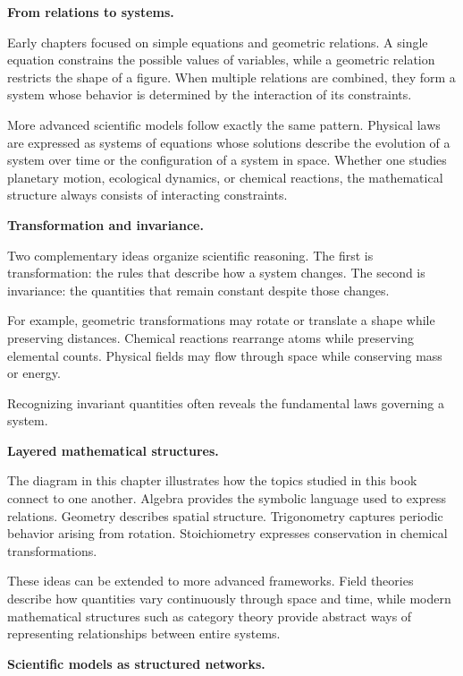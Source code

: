 \documentclass[11pt, openany]{book}
\theoremstyle{plain}
\theoremstyle{definition}
\theoremstyle{remark}
\begin{document}
\medskip

\textbf{From relations to systems.}

Early chapters focused on simple equations and geometric relations. A
single equation constrains the possible values of variables, while a
geometric relation restricts the shape of a figure. When multiple
relations are combined, they form a system whose behavior is determined
by the interaction of its constraints.

More advanced scientific models follow exactly the same pattern.
Physical laws are expressed as systems of equations whose solutions
describe the evolution of a system over time or the configuration of a
system in space. Whether one studies planetary motion, ecological
dynamics, or chemical reactions, the mathematical structure always
consists of interacting constraints.

\medskip

\textbf{Transformation and invariance.}

Two complementary ideas organize scientific reasoning. The first is
transformation: the rules that describe how a system changes. The second
is invariance: the quantities that remain constant despite those
changes.

For example, geometric transformations may rotate or translate a shape
while preserving distances. Chemical reactions rearrange atoms while
preserving elemental counts. Physical fields may flow through space
while conserving mass or energy.

Recognizing invariant quantities often reveals the fundamental laws
governing a system.

\medskip

\textbf{Layered mathematical structures.}

The diagram in this chapter illustrates how the topics studied in this
book connect to one another. Algebra provides the symbolic language used
to express relations. Geometry describes spatial structure. Trigonometry
captures periodic behavior arising from rotation. Stoichiometry
expresses conservation in chemical transformations.

These ideas can be extended to more advanced frameworks. Field theories
describe how quantities vary continuously through space and time, while
modern mathematical structures such as category theory provide abstract
ways of representing relationships between entire systems.

\medskip

\textbf{Scientific models as structured networks.}
\end{document}
